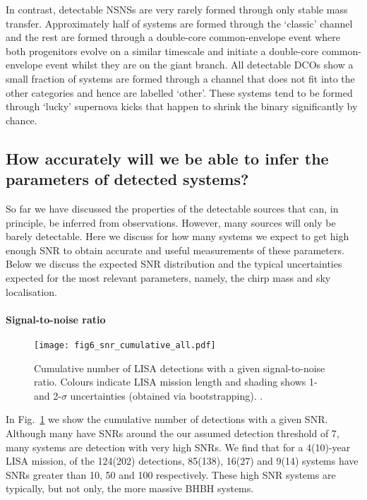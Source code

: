 In contrast, detectable NSNSs are very rarely formed through only stable mass transfer. Approximately half of systems are formed through the `classic' channel and the rest are formed through a double-core common-envelope event \citep{Brown+1995} where both progenitors evolve on a similar timescale and initiate a double-core common-envelope event whilst they are on the giant branch. All detectable DCOs show a small fraction of systems are formed through a channel that does not fit into the other categories and hence are labelled `other'. These systems tend to be formed through `lucky' supernova kicks that happen to shrink the binary significantly by chance.

\subsection{How accurately will we be able to infer the parameters of detected systems?}\label{sec:measurement_uncertainties}
So far we have discussed the properties of the detectable sources that can, in principle, be inferred from observations. However, many sources will only be barely detectable. Here we discuss for how many systems we expect to get high enough SNR to obtain accurate and useful measurements of these parameters. Below we discuss the expected SNR distribution and the typical uncertainties expected for the most relevant parameters, namely, the chirp mass and sky localisation.

\paragraph{Signal-to-noise ratio}

\begin{figure}[tb]
    \centering
    \texttt{[image: fig6\_snr\_cumulative\_all.pdf]}
    \caption{Cumulative number of LISA detections with a given signal-to-noise ratio. Colours indicate LISA mission length and shading shows 1- and 2-$\sigma$ uncertainties (obtained via bootstrapping). \href{https://github.com/TomWagg/detecting-DCOs-in-LISA/blob/main/paper/figures/fig6_snr_cumulative_all.pdf}{\faFileImage} \href{https://github.com/TomWagg/detecting-DCOs-in-LISA/blob/main/paper/figure_notebooks/fiducial.ipynb}{\faBook}.}
    \label{fig:snr_dist}
\end{figure}

In Fig.~\ref{fig:snr_dist} we show the cumulative number of detections with a given SNR. Although many have SNRs around the our assumed detection threshold of 7, many systems are detection with very high SNRs. We find that for a 4(10)-year LISA mission, of the 124(202) detections, 85(138), 16(27) and 9(14) systems have SNRs greater than 10, 50 and 100 respectively. These high SNR systems are typically, but not only, the more massive BHBH systems.

